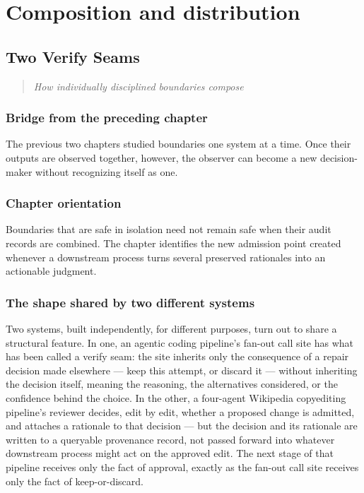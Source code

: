 \documentclass[11pt,openany]{book}
\newcommand{\chapterprecis}[1]{\begin{quote}\itshape #1\end{quote}}
\begin{document}
\part{Composition and distribution}

\chapter{Two Verify Seams}

\chapterprecis{How individually disciplined boundaries compose}

\section*{Bridge from the preceding chapter}

The previous two chapters studied boundaries one system at a time. Once their outputs are observed together, however, the observer can become a new decision-maker without recognizing itself as one.

\section*{Chapter orientation}

Boundaries that are safe in isolation need not remain safe when their audit records are combined. The chapter identifies the new admission point created whenever a downstream process turns several preserved rationales into an actionable judgment.

\section{The shape shared by two different systems}

Two systems, built independently, for different purposes, turn out to share a structural feature. In one, an agentic coding pipeline's fan-out call site has what has been called a verify seam: the site inherits only the consequence of a repair decision made elsewhere — keep this attempt, or discard it — without inheriting the decision itself, meaning the reasoning, the alternatives considered, or the confidence behind the choice. In the other, a four-agent Wikipedia copyediting pipeline's reviewer decides, edit by edit, whether a proposed change is admitted, and attaches a rationale to that decision — but the decision and its rationale are written to a queryable provenance record, not passed forward into whatever downstream process might act on the approved edit. The next stage of that pipeline receives only the fact of approval, exactly as the fan-out call site receives only the fact of keep-or-discard.
\end{document}
